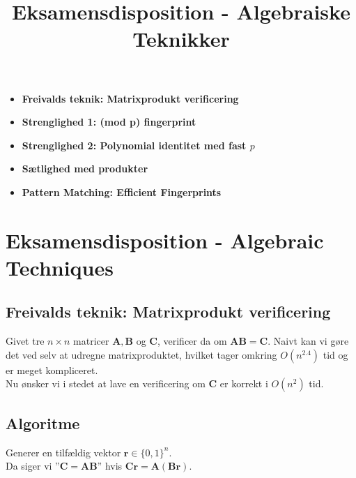 
\title{Eksamensdisposition - Algebraiske Teknikker}


\maketitle

\begin{itemize}
  \item \textbf{Freivalds teknik: Matrixprodukt verificering}
  \item \textbf{Strenglighed 1: (mod p) fingerprint}
  \item \textbf{Strenglighed 2: Polynomial identitet med fast $p$}
  \item \textbf{Sætlighed med produkter}
  \item \textbf{Pattern Matching: Efficient Fingerprints}
\end{itemize}



\newpage
\section{Eksamensdisposition - Algebraic Techniques}
\subsection{Freivalds teknik: Matrixprodukt verificering}

Givet tre $n \times n$ matricer $\mathbf A, \mathbf B$ og $\mathbf C$, verificer da om $\mathbf{AB} = \mathbf C$. Naivt kan vi gøre det ved selv at udregne matrixproduktet, hvilket tager omkring $O(n^{2.4})$ tid og er meget kompliceret.\\

Nu ønsker vi i stedet at lave en verificering om $\mathbf C$ er korrekt i $O(n^2)$ tid.

\subsection{Algoritme}
Generer en tilfældig vektor $\mathbf r \in \{0, 1\}^n$.\\
Da siger vi ''$\mathbf C = \mathbf{AB}$'' hvis $\mathbf{Cr} = \mathbf A (\mathbf{Br})$.


